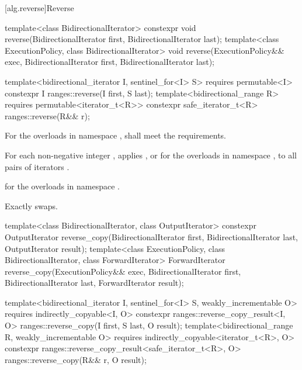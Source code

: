 [alg.reverse]{Reverse}

%
\begin{itemdecl}
template<class BidirectionalIterator>
  constexpr void reverse(BidirectionalIterator first, BidirectionalIterator last);
template<class ExecutionPolicy, class BidirectionalIterator>
  void reverse(ExecutionPolicy&& exec,
               BidirectionalIterator first, BidirectionalIterator last);

template<bidirectional_iterator I, sentinel_for<I> S>
  requires permutable<I>
  constexpr I ranges::reverse(I first, S last);
template<bidirectional_range R>
  requires permutable<iterator_t<R>>
  constexpr safe_iterator_t<R> ranges::reverse(R&& r);
\end{itemdecl}

\begin{itemdescr}
\pnum
\requires
For the overloads in namespace ,
 shall meet
the  requirements.

\pnum
\effects
For each non-negative integer ,
applies , or
 for the overloads in namespace ,
to all pairs of iterators .

\pnum
\returns
{} for the overloads in namespace .

\pnum
\complexity
Exactly  swaps.
\end{itemdescr}

%
\begin{itemdecl}
template<class BidirectionalIterator, class OutputIterator>
  constexpr OutputIterator
    reverse_copy(BidirectionalIterator first, BidirectionalIterator last,
                 OutputIterator result);
template<class ExecutionPolicy, class BidirectionalIterator, class ForwardIterator>
  ForwardIterator
    reverse_copy(ExecutionPolicy&& exec,
                 BidirectionalIterator first, BidirectionalIterator last,
                 ForwardIterator result);

template<bidirectional_iterator I, sentinel_for<I> S, weakly_incrementable O>
  requires indirectly_copyable<I, O>
  constexpr ranges::reverse_copy_result<I, O>
    ranges::reverse_copy(I first, S last, O result);
template<bidirectional_range R, weakly_incrementable O>
  requires indirectly_copyable<iterator_t<R>, O>
  constexpr ranges::reverse_copy_result<safe_iterator_t<R>, O>
    ranges::reverse_copy(R&& r, O result);
\end{itemdecl}

